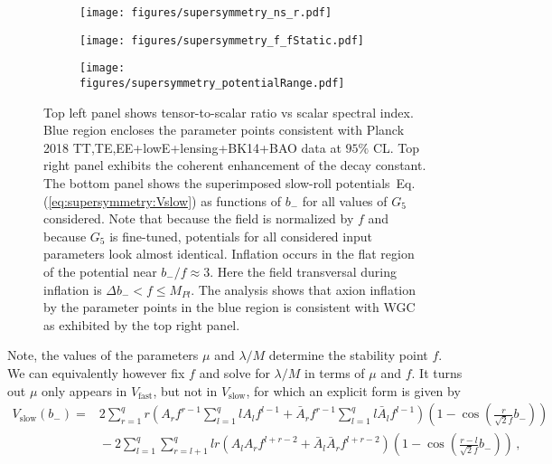 \documentclass[12pt]{article}
\begin{document}
\begin{figure}
  \centering
  \begin{subfigure}{0.45 \textwidth}
    \texttt{[image: figures/supersymmetry\_ns\_r.pdf]}
  \end{subfigure}
  \begin{subfigure}{0.45 \textwidth}
    \texttt{[image: figures/supersymmetry\_f\_fStatic.pdf]}
  \end{subfigure}
  \begin{subfigure}{0.45 \textwidth}
    \texttt{[image: figures/supersymmetry\_potentialRange.pdf]}
  \end{subfigure}
  \caption{\protect
    Top left panel shows tensor-to-scalar ratio vs scalar spectral index.
    Blue region encloses the parameter points consistent with Planck 2018 TT,TE,EE+lowE+lensing+BK14+BAO data at $95\%$ CL.
    Top right panel exhibits the coherent enhancement of the decay constant.
    The bottom panel shows the superimposed slow-roll potentials~Eq.(\ref{eq:supersymmetry:Vslow}) as functions of $b_-$ for all values of $G_5$ considered.
    Note that because the field is normalized by $f$ and because $G_5$ is fine-tuned, potentials for all considered input parameters look almost identical.
    Inflation occurs in the flat region of the potential near $b_- / f \approx 3$.
    Here the field transversal during inflation is $\Delta b_- < f \le M_{Pl}$.
    The analysis shows that axion inflation by the parameter points in the blue region is consistent with WGC as exhibited by the top right panel.
  } \label{fig:supersymmetry}
\end{figure}
Note, the values of the parameters $\mu$ and $\lambda / M$ determine the stability point $f$.
We can equivalently however fix $f$ and solve for $\lambda / M$ in terms of $\mu$ and $f$.
It turns out $\mu$ only appears in $V_\text{fast}$, but not in $V_\text{slow}$, for which an explicit form is given by
\begin{equation} \label{eq:supersymmetry:VslowGeneral}
  \begin{aligned}
    V_\text{slow}\left(b_-\right) =
      &2 \sum_{r = 1}^q r
        \left(A_r f^{r - 1} \sum_{l = 1}^q l A_l f^{l - 1}
          + \bar A_r f^{r - 1} \sum_{l = 1}^q l \bar A_l f^{l - 1}\right)
        \left(1 - \cos\left(\frac{r}{\sqrt 2 f} b_-\right)\right)\\
      &{} - 2 \sum_{l = 1}^q \sum_{r = l + 1}^q
        l r \left(A_l A_r f^{l + r - 2} + \bar A_l \bar A_r f^{l + r - 2}\right)
        \left(1 - \cos\left(\frac{r - l}{\sqrt 2 f} b_-\right)\right)\,,
  \end{aligned}
\end{equation}
\end{document}
